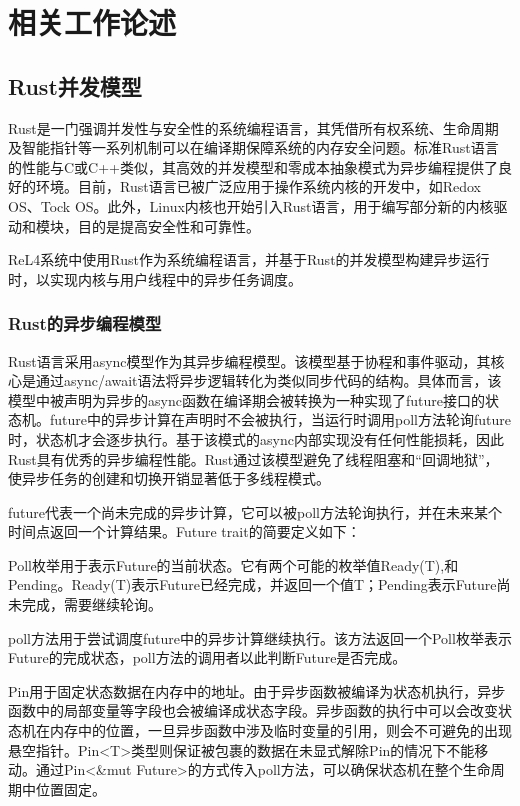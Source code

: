 \chapter{相关工作论述}

\section{Rust并发模型}

Rust是一门强调并发性与安全性的系统编程语言，其凭借所有权系统、生命周期及智能指针等一系列机制可以在编译期保障系统的内存安全问题\cite{jung2020safe}。标准Rust语言的性能与C或C++类似，其高效的并发模型和零成本抽象模式为异步编程提供了良好的环境。目前，Rust语言已被广泛应用于操作系统内核的开发中，如Redox OS\cite{redoxdocs}、Tock OS\cite{Tockos}。此外，Linux内核也开始引入Rust语言，用于编写部分新的内核驱动和模块，目的是提高安全性和可靠性\cite{linux-kernel-rust-docs}。

ReL4系统中使用Rust作为系统编程语言，并基于Rust的并发模型构建异步运行时，以实现内核与用户线程中的异步任务调度。

\subsection{Rust的异步编程模型}

Rust语言采用async模型作为其异步编程模型。该模型基于协程和事件驱动，其核心是通过async/await语法将异步逻辑转化为类似同步代码的结构。具体而言，该模型中被声明为异步的async函数在编译期会被转换为一种实现了future接口的状态机。future中的异步计算在声明时不会被执行，当运行时调用poll方法轮询future时，状态机才会逐步执行。基于该模式的async内部实现没有任何性能损耗，因此Rust具有优秀的异步编程性能。Rust通过该模型避免了线程阻塞和“回调地狱”，使异步任务的创建和切换开销显著低于多线程模式。

future代表一个尚未完成的异步计算，它可以被poll方法轮询执行，并在未来某个时间点返回一个计算结果。Future trait的简要定义如下：

Poll枚举用于表示Future的当前状态。它有两个可能的枚举值Ready(T),和Pending。Ready(T)表示Future已经完成，并返回一个值T；Pending表示Future尚未完成，需要继续轮询。

poll方法用于尝试调度future中的异步计算继续执行。该方法返回一个Poll枚举表示Future的完成状态，poll方法的调用者以此判断Future是否完成。

Pin用于固定状态数据在内存中的地址。由于异步函数被编译为状态机执行，异步函数中的局部变量等字段也会被编译成状态字段。异步函数的执行中可以会改变状态机在内存中的位置，一旦异步函数中涉及临时变量的引用，则会不可避免的出现悬空指针。Pin<T>类型则保证被包裹的数据在未显式解除Pin的情况下不能移动。通过Pin<\&mut Future>的方式传入poll方法，可以确保状态机在整个生命周期中位置固定。

